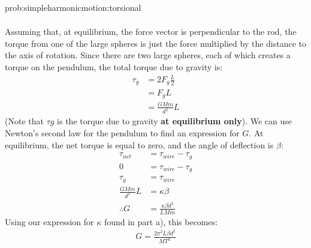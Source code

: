 \begin{solution}{prob:simpleharmonicmotion:torsional}
\begin{enumerate}[(a)]
\begin{align*}
\end{align*}
Assuming that, at equilibrium, the force vector is perpendicular to the rod, the torque from one of the large spheres is just the force multiplied by the distance to the axis of rotation. Since there are two large spheres, each of which creates a torque on the pendulum, the total torque due to gravity is: 
\begin{align*}
\tau_g&=2F_g\frac{L}{2}\\
&=F_gL\\
&=\frac{GMm}{d^2}L
\end{align*}
(Note that $\tau g$ is the torque due to gravity \textbf{at equilibrium only}). We can use Newton's second law for the pendulum to find an expression for $G$. At equilibrium, the net torque is equal to zero, and the angle of deflection is $\beta$:
\begin{align*}
\tau_{net}&=\tau_{wire}-\tau_g\\
0&=\tau_{wire}-\tau_g\\
\tau_g&=\tau_{wire}\\
\frac{GMm}{d^2}L&=\kappa\beta\\
\therefore G&=\frac{\kappa\beta d^2}{LMm}
\end{align*}
Using our expression for $\kappa$ found in part a), this becomes:
\begin{align*}
G=\frac{2\pi^2L\beta d^2}{MT^2}
\end{align*}
\end{enumerate}
\end{solution}



